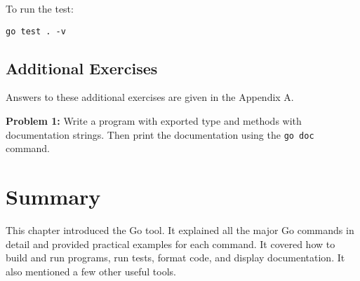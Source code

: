 To run the test:

\begin{lstlisting}[numbers=none]
go test . -v
\end{lstlisting}

\subsection{Additional Exercises}

Answers to these additional exercises are given in the Appendix A.

{\bfseries Problem 1:} Write a program with exported type and methods
with documentation strings.  Then print the documentation
using the \texttt{go doc} command.

\section*{Summary}

This chapter introduced the Go tool. It explained all the major Go commands in
detail and provided practical examples for each command. It covered how to build
and run programs, run tests, format code, and display documentation. It also
mentioned a few other useful tools.
